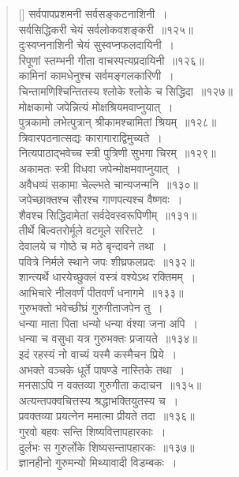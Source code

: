 \documentclass[twoside,12pt,notitlepage]{book}
\begin{document}
\begin{verse}[\versewidth]
सर्वपापप्रशमनी सर्वसङ्कटनाशिनी~।\\[-6pt]
सर्वसिद्धिकरी चेयं सर्वलोकवशङ्करी~॥१२५॥\\
दुःस्वप्ननाशिनी चेयं सुस्वप्नफलदायिनी~।\\[-6pt]
रिपूणां स्तम्भनी गीता वाचस्पत्यप्रदायिनी~॥१२६॥\\
कामिनां कामधेनुश्च सर्वमङ्गलकारिणी~।\\[-6pt]
चिन्तामणिश्चिन्तितस्य श्लोके श्लोके च सिद्धिदा~॥१२७॥\\
मोक्षकामो जपेन्नित्यं मोक्षश्रियमवाप्नुयात्~।\\[-6pt]
पुत्रकामो लभेत्पुत्रान् श्रीकामश्चामितां श्रियम्~॥१२८॥\\
त्रिवारपठनात्सद्यः कारागाराद्विमुच्यते~।\\[-6pt]
नित्यपाठाद्भवेच्च स्त्री पुत्रिणी सुभगा चिरम्~॥१२९॥\\
अकामतः स्त्री विधवा जपेन्मोक्षमवाप्नुयात्~।\\[-6pt]
अवैधव्यं सकामा चेल्ल्भते चान्यजन्मनि~॥१३०॥\\
जपेच्छाक्तश्च सौरश्च गाणपत्यश्च वैष्णवः~।\\[-6pt]
शैवश्च सिद्धिदामेतां सर्वदेवस्वरूपिणीम्~॥१३१॥\\
तीर्थे बिल्वतरोर्मूले वटमूले सरित्तटे~।\\[-6pt]
देवालये च गोष्ठे च मठे बृन्दावने तथा~।\\[-6pt]
पवित्रे निर्मले स्थाने जपः शीघ्रफलप्रदः~॥१३२॥\\
शान्त्यर्थे धारयेच्छुक्लं वस्त्रं वश्येऽथ रक्तिमम्~।\\[-6pt]
आभिचारे नीलवर्णं पीतवर्णं धनागमे~॥१३३॥\\
गुरुभक्तो भवेच्छीघ्रं गुरुगीताजपेन तु~।\\[-6pt]
धन्या माता पिता धन्यो धन्या वंश्या जना अपि~।\\[-6pt]
धन्या च वसुधा यत्र गुरुभक्तः प्रजायते~॥१३४॥\\
इदं रहस्यं नो वाच्यं यस्मै कस्मैचन प्रिये~।\\[-6pt]
अभक्ते वञ्चके धूर्ते पाषण्डे नास्तिके तथा~।\\[-6pt]
मनसाऽपि न वक्तव्या गुरुगीता कदाचन~॥१३५॥\\
अत्यन्तपक्वचित्तस्य श्रद्धाभक्तियुतस्य च~।\\[-6pt]
प्रवक्तव्या प्रयत्नेन ममात्मा प्रीयते तदा~॥१३६॥\\
गुरवो बहवः सन्ति शिष्यवित्तापहारकाः~।\\[-6pt]
दुर्लभः स गुरुर्लोके शिष्यसन्तापहारकः~॥१३७॥\\
ज्ञानहीनो गुरुमन्यो मिथ्यावादी विडम्बकः~।\\[-6pt]

\end{verse}
\end{document}
